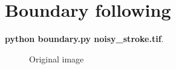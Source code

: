 \pagebreak

\section{Boundary following}

\textbf{python boundary.py noisy\_stroke.tif}.

\begin{figure}[!htb]\centering
    \begin{minipage}{0.45\textwidth}
        \caption{\small{Original image}}
    \end{minipage}
    \begin{minipage}{0.45\textwidth}

\end{minipage}
\end{figure}
